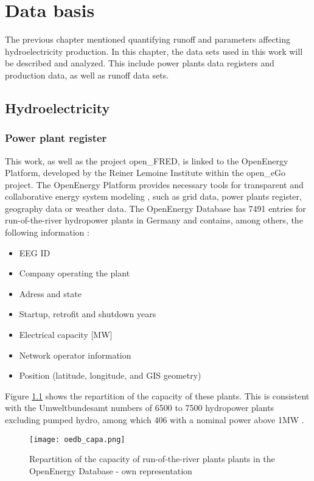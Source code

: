 \chapter{Data basis}
\label{chap:data_basis}

The previous chapter mentioned quantifying runoff and parameters affecting hydroelectricity production. In this chapter, the data sets used in this work will be described and analyzed. This include power plants data registers and production data, as well as runoff data sets.

\section{Hydroelectricity}
\label{hpp_register}

\subsection{Power plant register}

This work, as well as the project open\_FRED, is linked to the OpenEnergy Platform, developed by the Reiner Lemoine Institute within the open\_eGo project. The OpenEnergy Platform provides necessary tools for transparent and collaborative energy system modeling \cite{oedb}, such as grid data, power plants register, geography data or weather data. The OpenEnergy Database has 7491 entries for run-of-the-river hydropower plants in Germany and contains, among others, the following information :
\begin{itemize}
\itemsep0em 
 \item EEG ID
 \item Company operating the plant
 \item Adress and state
 \item Startup, retrofit and shutdown years
 \item Electrical capacity [MW]
 \item Network operator information
 \item Position (latitude, longitude, and GIS geometry)
\end{itemize}


Figure \ref{oedb_capa} shows the repartition of the capacity of these plants. This is consistent with the Umweltbundesamt numbers of 6500 to 7500 hydropower plants excluding pumped hydro, among which 406 with a nominal power above 1MW \cite{uba_wasserkraft}. 

\begin{figure}[H]
\texttt{[image: oedb\_capa.png]}
\caption[Repartition of the capacity of run-of-the-river plants in the OpenEnergy Database]{Repartition of the capacity of run-of-the-river plants plants in the OpenEnergy Database - own representation}
\centering
\label{oedb_capa}
\end{figure}

